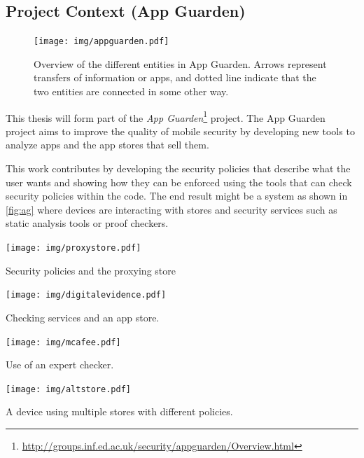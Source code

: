 \documentclass[a4paper,sfsidenotes]{%
  article%
}
\begin{document}
\subsection{Project Context (App Guarden)}

\begin{figure}
  \texttt{[image: img/appguarden.pdf]}
  \caption{Overview of the different entities in App Guarden.  Arrows represent
  transfers of information or apps, and dotted line indicate that the two
  entities are connected in some other way.}
\label{fig:ag}
\end{figure}

This thesis will form part of the \emph{App
Guarden}\footnote{\url{http://groups.inf.ed.ac.uk/security/appguarden/Overview.html}}
project.  The App Guarden project aims to improve the quality of mobile security
by developing new tools to analyze apps and the app stores that sell them.

This work contributes by developing the security policies that describe what the
user wants and showing how they can be enforced using the tools that can check
security policies within the code.  The end result might be a system as shown in
\autoref{fig:ag} where devices are interacting with stores and security
services such as static analysis tools or proof checkers. 

\begin{marginfigure}
  \texttt{[image: img/proxystore.pdf]}
  \caption{Security policies and the proxying store}
  \label{fig:proxy}
\end{marginfigure}

\begin{marginfigure}
  \texttt{[image: img/digitalevidence.pdf]}
  \caption{Checking services and an app store.}
  \label{fig:de}
\end{marginfigure}

\begin{marginfigure}
  
  \texttt{[image: img/mcafee.pdf]}
  \caption{Use of an expert checker.}
\label{fig:mcafee}
\end{marginfigure}

\begin{marginfigure}
  
  \texttt{[image: img/altstore.pdf]}
  \caption{A device using multiple stores with different policies.}
\label{fig:altstore}
\end{marginfigure}
\end{document}
